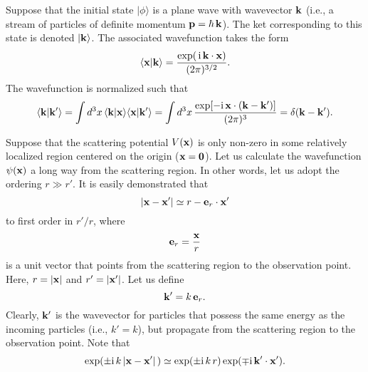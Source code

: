 Suppose that the initial state $|\phi\rangle$ is a plane wave with  wavevector  ${\bf k}$ ({\rm i.e.}, a stream of particles of
definite momentum ${\bf p} = \hbar \,{\bf k}$). The ket corresponding to
this  state is denoted $|{\bf k}\rangle$. The associated wavefunction 
takes the form 
\begin{equation}
\langle {\bf x} | {\bf k}\rangle = \frac{
\exp(\,{\rm i}\,{\bf k}\cdot{\bf x}) }{(2\pi)^{3/2}}.
\end{equation}
The wavefunction is normalized such that
\begin{equation}
\langle {\bf k}|{\bf k}'\rangle =\int d^3 x\, \langle {\bf k}|{\bf x}\rangle
\langle {\bf x} |{\bf k}'\rangle
= \int d^3 x\, \frac{ \exp[-{\rm i}\, {\bf x}\cdot({\bf k} -{\bf k}')]}
{(2\pi )^3} = \delta ({\bf k} - {\bf k'}).
\end{equation}

Suppose that the scattering potential $V({\bf x})$ is only non-zero in some
relatively localized region centered on the origin (${\bf x} = {\bf 0}$).
Let us calculate the wavefunction $\psi({\bf x})$ a long way from
the scattering region. In other words, let us adopt the ordering
$r\gg r'$. It is easily demonstrated that
\begin{equation}
|{\bf x} - {\bf x}'| \simeq r - {\bf e}_r\cdot{\bf x}'
\end{equation}
to first order in $r'/r$, where
\begin{equation}
{\bf e}_r = \frac{\bf x}{r}
\end{equation}
is a unit vector that points from the scattering region to the
observation point. Here, $r=|{\bf x}|$ and $r'=|{\bf x}'|$. Let us define
\begin{equation}
{\bf k}' = k\,{\bf e}_r.
\end{equation}
Clearly, ${\bf k}'$ is the wavevector for particles that possess the
same energy as the incoming particles ({\rm i.e.}, $k'=k$), but propagate
from the scattering region to the observation point. Note that
\begin{equation}
\exp(\pm {\rm i}\, k\,|{\bf x} - {\bf x}' |\,) \simeq
\exp(\pm {\rm i}\, k \,r) \exp(\mp {\rm i}\, {\bf k}' \cdot {\bf x}').
\end{equation}

